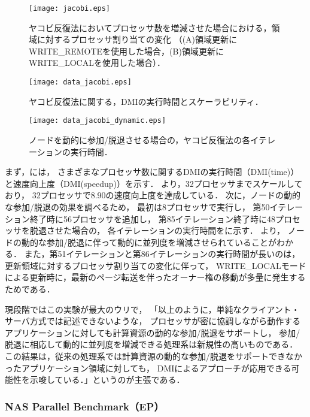 \documentclass[10pt]{jsarticle}
\begin{document}
\begin{figure}
  \centering
  \texttt{[image: jacobi.eps]}
  \caption{ヤコビ反復法においてプロセッサ数を増減させた場合における，領域に対するプロセッサ割り当ての変化
    （(A)領域更新にWRITE\_REMOTEを使用した場合，(B)領域更新にWRITE\_LOCALを使用した場合）．}
  \label{fig:jacobi}
\end{figure}

\begin{figure}
  \centering
  \texttt{[image: data\_jacobi.eps]}
  \caption{ヤコビ反復法に関する，DMIの実行時間とスケーラビリティ．}
  \label{fig:data_jacobi}
\end{figure}

\begin{figure}
  \centering
  \texttt{[image: data\_jacobi\_dynamic.eps]}
  \caption{ノードを動的に参加/脱退させる場合の，ヤコビ反復法の各イテレーションの実行時間．}
  \label{fig:data_jacobi_dynamic}
\end{figure}

まず，には，
さまざまなプロセッサ数に関するDMIの実行時間（DMI(time)）と速度向上度（DMI(speedup)）を示す．
より，32プロセッサまでスケールしており，
32プロセッサで8.90の速度向上度を達成している．
次に，ノードの動的な参加/脱退の効果を調べるため，
最初は8プロセッサで実行し，
第50イテレーション終了時に56プロセッサを追加し，
第85イテレーション終了時に48プロセッサを脱退させた場合の，
各イテレーションの実行時間をに示す．
より，
ノードの動的な参加/脱退に伴って動的に並列度を増減させられていることがわかる．
また，第51イテレーションと第86イテレーションの実行時間が長いのは，
更新領域に対するプロセッサ割り当ての変化に伴って，
WRITE\_LOCALモードによる更新時に，最新のページ転送を伴ったオーナー権の移動が多量に発生するためである．


現段階ではこの実験が最大のウリで，
「以上のように，単純なクライアント・サーバ方式では記述できないような，
プロセッサが密に協調しながら動作するアプリケーションに対しても計算資源の動的な参加/脱退をサポートし，
参加/脱退に相応して動的に並列度を増減できる処理系は新規性の高いものである．
この結果は，従来の処理系では計算資源の動的な参加/脱退をサポートできなかったアプリケーション領域に対しても，
DMIによるアプローチが応用できる可能性を示唆している．」というのが主張である．

\subsubsection{NAS Parallel Benchmark（EP）}
\label{sec:perform_ep}
\end{document}
